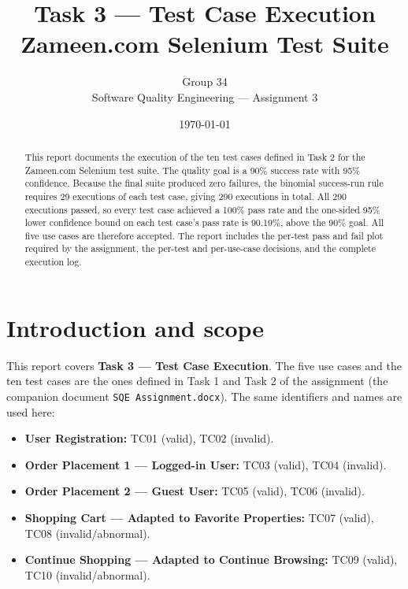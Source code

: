 \documentclass[11pt,a4paper]{article}
\title{%
  \textbf{Task 3 --- Test Case Execution}\\[0.3em]
  \large Zameen.com Selenium Test Suite
}
\author{Group 34\\Software Quality Engineering --- Assignment 3}
\date{\today}
\begin{document}
\maketitle

\begin{abstract}
This report documents the execution of the ten test cases defined in Task 2
for the Zameen.com Selenium test suite. The quality goal is a 90\% success
rate with 95\% confidence. Because the final suite produced zero failures,
the binomial success-run rule requires 29 executions of each test case,
giving 290 executions in total. All 290 executions passed, so every test
case achieved a 100\% pass rate and the one-sided 95\% lower confidence
bound on each test case's pass rate is 90.19\%, above the 90\% goal. All five
use cases are therefore accepted. The report includes the per-test pass and
fail plot required by the assignment, the per-test and per-use-case
decisions, and the complete execution log.
\end{abstract}

\tableofcontents
\newpage

\section{Introduction and scope}

This report covers \textbf{Task 3 --- Test Case Execution}. The five use
cases and the ten test cases are the ones defined in Task 1 and Task 2 of
the assignment (the companion document \texttt{SQE Assignment.docx}). The
same identifiers and names are used here:

\begin{itemize}[leftmargin=1.5em]
  \item \textbf{User Registration:} TC01 (valid), TC02 (invalid).
  \item \textbf{Order Placement 1 --- Logged-in User:} TC03 (valid),
        TC04 (invalid).
  \item \textbf{Order Placement 2 --- Guest User:} TC05 (valid),
        TC06 (invalid).
  \item \textbf{Shopping Cart --- Adapted to Favorite Properties:} TC07
        (valid), TC08 (invalid/abnormal).
  \item \textbf{Continue Shopping --- Adapted to Continue Browsing:} TC09
        (valid), TC10 (invalid/abnormal).
\end{itemize}
\end{document}
